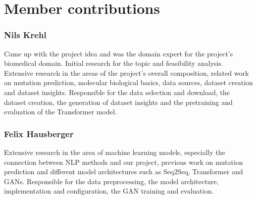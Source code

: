 \section*{Member contributions}

\subsubsection*{Nils Krehl}

Came up with the project idea and was the domain expert for the project's biomedical domain. Initial research for the topic and feasibility analysis.
Extensive research in the areas of the project's overall composition, related work on mutation prediction, molecular biological basics, data sources, dataset creation and dataset insights.
Responsible for the data selection and download, the dataset creation, the generation of dataset insights and the pretraining and evaluation of the Transformer model.


\subsubsection*{Felix Hausberger}

Extensive research in the area of machine learning models, especially the connection between \ac{NLP} methods and our project, previous work on mutation prediction and different model ar\-chi\-tec\-tu\-res such as \ac{Seq2Seq}, Transformer and \acp{GAN}.
Responsible for the data preprocessing, the model ar\-chi\-tec\-tu\-re, implementation and configuration, the GAN training and evaluation.